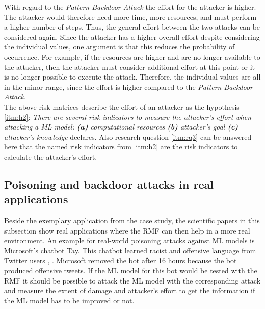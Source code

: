 With regard to the \textit{Pattern Backdoor Attack} the effort for the attacker is higher. The attacker would therefore need more time, more resources, and must perform a higher number of steps. Thus, the general effort between the two attacks can be considered again. Since the attacker has a higher overall effort despite considering the individual values, one argument is that this reduces the probability of occurrence. For example, if the resources are higher and are no longer available to the attacker, then the attacker must consider additional effort at this point or it is no longer possible to execute the attack. Therefore, the individual values are all in the minor range, since the effort is higher compared to the \textit{Pattern Backdoor Attack}. \\
The above risk matrices describe the effort of an attacker as the hypothesis \ref{itm:h2}: \textit{There are several risk indicators to measure the attacker's effort when attacking a ML model: \textbf{(a)} computational resources \textbf{(b)} attacker's goal \textbf{(c)} attacker's knowledge} declares. Also research question \ref{itm:rq3} can be answered here that the named risk indicators from \ref{itm:h2} are the risk indicators to calculate the attacker's effort.

\subsection{Poisoning and backdoor attacks in real applications}

Beside the exemplary application from the case study, the scientific papers in this subsection show real applications where the RMF can then help in a more real environment. An example for real-world poisoning attacks against ML models is Microsoft's chatbot Tay. This chatbot learned racist and offensive language from Twitter users \cite{DBLP:conf/iciot/BaracaldoCLSZ18}, \cite{DBLP:conf/ccs/BaracaldoCLS17}. Microsoft removed the bot after 16 hours because the bot produced offensive tweets. If the ML model for this bot would be tested with the RMF it should be possible to attack the ML model with the corresponding attack and measure the extent of damage and attacker's effort to get the information if the ML model has to be improved or not.

